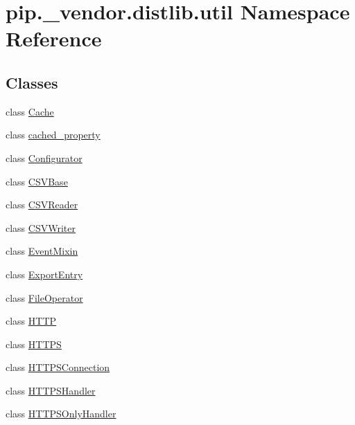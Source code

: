 \hypertarget{namespacepip_1_1__vendor_1_1distlib_1_1util}{}\section{pip.\+\_\+vendor.\+distlib.\+util Namespace Reference}
\label{namespacepip_1_1__vendor_1_1distlib_1_1util}
\subsection*{Classes}
\begin{DoxyCompactItemize}
\item 
class \hyperlink{classpip_1_1__vendor_1_1distlib_1_1util_1_1Cache}{Cache}
\item 
class \hyperlink{classpip_1_1__vendor_1_1distlib_1_1util_1_1cached__property}{cached\+\_\+property}
\item 
class \hyperlink{classpip_1_1__vendor_1_1distlib_1_1util_1_1Configurator}{Configurator}
\item 
class \hyperlink{classpip_1_1__vendor_1_1distlib_1_1util_1_1CSVBase}{C\+S\+V\+Base}
\item 
class \hyperlink{classpip_1_1__vendor_1_1distlib_1_1util_1_1CSVReader}{C\+S\+V\+Reader}
\item 
class \hyperlink{classpip_1_1__vendor_1_1distlib_1_1util_1_1CSVWriter}{C\+S\+V\+Writer}
\item 
class \hyperlink{classpip_1_1__vendor_1_1distlib_1_1util_1_1EventMixin}{Event\+Mixin}
\item 
class \hyperlink{classpip_1_1__vendor_1_1distlib_1_1util_1_1ExportEntry}{Export\+Entry}
\item 
class \hyperlink{classpip_1_1__vendor_1_1distlib_1_1util_1_1FileOperator}{File\+Operator}
\item 
class \hyperlink{classpip_1_1__vendor_1_1distlib_1_1util_1_1HTTP}{H\+T\+TP}
\item 
class \hyperlink{classpip_1_1__vendor_1_1distlib_1_1util_1_1HTTPS}{H\+T\+T\+PS}
\item 
class \hyperlink{classpip_1_1__vendor_1_1distlib_1_1util_1_1HTTPSConnection}{H\+T\+T\+P\+S\+Connection}
\item 
class \hyperlink{classpip_1_1__vendor_1_1distlib_1_1util_1_1HTTPSHandler}{H\+T\+T\+P\+S\+Handler}
\item 
class \hyperlink{classpip_1_1__vendor_1_1distlib_1_1util_1_1HTTPSOnlyHandler}{H\+T\+T\+P\+S\+Only\+Handler}
\item 

\end{DoxyCompactItemize}

